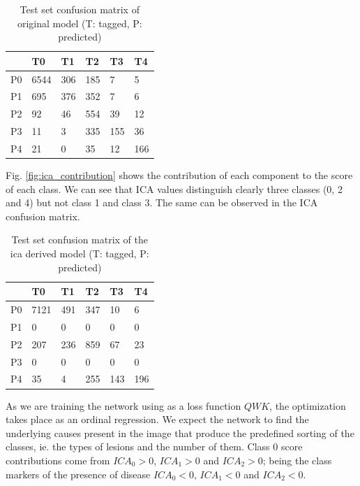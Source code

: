 \documentclass[review]{elsarticle}
\theoremstyle{definition} %
\theoremstyle{remark}
\begin{document}
\begin{table}
	\centering
	\begin{tabular}{l|lllll}
		& T0 & T1 & T2 & T3 & T4 \\
		\hline
		P0 & 6544 & 306 & 185 &   7 &   5 \\
		P1 &  695 & 376 & 352 &   7 &   6 \\
		P2 &   92 &  46 & 554 &  39 &  12 \\
		P3 &   11 &   3 & 335 & 155 &  36 \\
		P4 &   21 &   0 &  35 &  12 & 166 \\
	\end{tabular}
	\caption{Test set confusion matrix of original model (T: tagged, P: predicted)}
	\label{tab:cm_orig}	
\end{table}

Fig. \ref{fig:ica_contribution} shows the contribution of each component to the score of each class. We can see that ICA values distinguish clearly three classes (0, 2 and 4) but not class 1 and class 3. The same can be observed in the ICA confusion matrix.



\begin{table}
	\centering
	\begin{tabular}{l|lllll}
		& T0 & T1 & T2 & T3 & T4 \\
		\hline
		P0 & 7121 & 491 & 347 &  10 &   6 \\
		P1 &    0 &   0 &   0 &   0 &   0 \\
		P2 &  207 & 236 & 859 &  67 &  23 \\
		P3 &    0 &   0 &   0 &   0 &   0 \\
		P4 &   35 &   4 & 255 & 143 & 196 \\
	\end{tabular}
	\caption{Test set confusion matrix of the ica derived model (T: tagged, P: predicted)}
	\label{tab:cm_ica}	
\end{table}


As we are training the network using as a loss function $QWK$, the optimization takes place as an ordinal regression. We expect the network to find the underlying causes present in the image that produce the predefined sorting of the classes, ie. the types of lesions and the number of them. Class 0 score contributions come from $ICA_0 > 0$, $ICA_1 > 0$ and $ICA_2 > 0$; being the class markers of the presence of disease $ICA_0 < 0$, $ICA_1 < 0$ and $ICA_2 < 0$.
\end{document}
